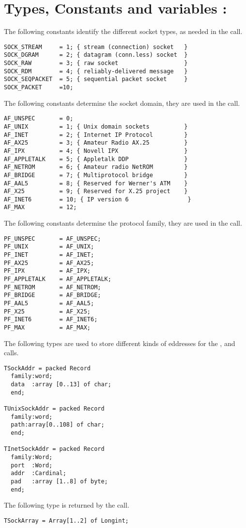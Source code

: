 \section {Types, Constants and variables : }
The following constants identify the different socket types, as needed in
the  call.
\begin{verbatim}
SOCK_STREAM     = 1; { stream (connection) socket   }
SOCK_DGRAM      = 2; { datagram (conn.less) socket  }
SOCK_RAW        = 3; { raw socket                   }
SOCK_RDM        = 4; { reliably-delivered message   }
SOCK_SEQPACKET  = 5; { sequential packet socket     }
SOCK_PACKET     =10;
\end{verbatim}
The following constants determine the socket domain, they are used in the
 call.
\begin{verbatim}
AF_UNSPEC       = 0;
AF_UNIX         = 1; { Unix domain sockets          }
AF_INET         = 2; { Internet IP Protocol         }
AF_AX25         = 3; { Amateur Radio AX.25          }
AF_IPX          = 4; { Novell IPX                   }
AF_APPLETALK    = 5; { Appletalk DDP                }
AF_NETROM       = 6; { Amateur radio NetROM         }
AF_BRIDGE       = 7; { Multiprotocol bridge         }
AF_AAL5         = 8; { Reserved for Werner's ATM    }
AF_X25          = 9; { Reserved for X.25 project    }
AF_INET6        = 10; { IP version 6                 }
AF_MAX          = 12;
\end{verbatim}
The following constants determine the protocol family, they are used in the
 call.
\begin{verbatim} 
PF_UNSPEC       = AF_UNSPEC;
PF_UNIX         = AF_UNIX;
PF_INET         = AF_INET;
PF_AX25         = AF_AX25;
PF_IPX          = AF_IPX;
PF_APPLETALK    = AF_APPLETALK;
PF_NETROM       = AF_NETROM;
PF_BRIDGE       = AF_BRIDGE;
PF_AAL5         = AF_AAL5;
PF_X25          = AF_X25;
PF_INET6        = AF_INET6;
PF_MAX          = AF_MAX;   
\end{verbatim}
The following types are used to store different kinds of eddresses for the
,  and  calls.
\begin{verbatim}  
TSockAddr = packed Record
  family:word;
  data  :array [0..13] of char;
  end;

TUnixSockAddr = packed Record
  family:word;
  path:array[0..108] of char;
  end;

TInetSockAddr = packed Record
  family:Word;
  port  :Word;
  addr  :Cardinal;
  pad   :array [1..8] of byte; 
  end;
\end{verbatim}
The following type is returned by the  call.
\begin{verbatim}
TSockArray = Array[1..2] of Longint;
\end{verbatim}

